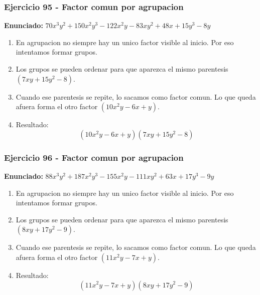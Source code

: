 \documentclass[11pt,a4paper]{article}
\begin{document}
\subsubsection*{Ejercicio 95 - Factor comun por agrupacion}
\textbf{Enunciado:} $ 70 x^{3} y^{2} + 150 x^{2} y^{3} - 122 x^{2} y - 83 x y^{2} + 48 x + 15 y^{3} - 8 y $\par
\begin{enumerate}[leftmargin=2em]
\item En agrupacion no siempre hay un unico factor visible al inicio. Por eso intentamos formar grupos.
\item Los grupos se pueden ordenar para que aparezca el mismo parentesis \((7 x y + 15 y^{2} - 8)\).
\item Cuando ese parentesis se repite, lo sacamos como factor comun. Lo que queda afuera forma el otro factor \((10 x^{2} y - 6 x + y)\).
\item Resultado: \[\boxed{\left(10 x^{2} y - 6 x + y\right)\left(7 x y + 15 y^{2} - 8\right)}\]
\end{enumerate}

\vspace{0.2cm}
\subsubsection*{Ejercicio 96 - Factor comun por agrupacion}
\textbf{Enunciado:} $ 88 x^{3} y^{2} + 187 x^{2} y^{3} - 155 x^{2} y - 111 x y^{2} + 63 x + 17 y^{3} - 9 y $\par
\begin{enumerate}[leftmargin=2em]
\item En agrupacion no siempre hay un unico factor visible al inicio. Por eso intentamos formar grupos.
\item Los grupos se pueden ordenar para que aparezca el mismo parentesis \((8 x y + 17 y^{2} - 9)\).
\item Cuando ese parentesis se repite, lo sacamos como factor comun. Lo que queda afuera forma el otro factor \((11 x^{2} y - 7 x + y)\).
\item Resultado: \[\boxed{\left(11 x^{2} y - 7 x + y\right)\left(8 x y + 17 y^{2} - 9\right)}\]
\end{enumerate}

\vspace{0.2cm}
\end{document}
